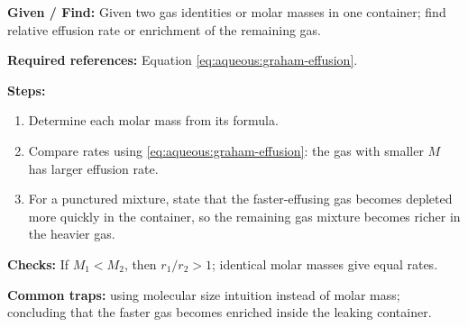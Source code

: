 \textbf{Given / Find:} Given two gas identities or molar masses in one container; find relative effusion rate or enrichment of the remaining gas.

\textbf{Required references:} Equation \eqref{eq:aqueous:graham-effusion}.


\textbf{Steps:}
\begin{enumerate}
    \item Determine each molar mass from its formula.
    \item Compare rates using \eqref{eq:aqueous:graham-effusion}: the gas with smaller \(M\) has larger effusion rate.
    \item For a punctured mixture, state that the faster-effusing gas becomes depleted more quickly in the container, so the remaining gas mixture becomes richer in the heavier gas.
\end{enumerate}

\textbf{Checks:} If \(M_1<M_2\), then \(r_1/r_2>1\); identical molar masses give equal rates.

\textbf{Common traps:} using molecular size intuition instead of molar mass; concluding that the faster gas becomes enriched inside the leaking container.
